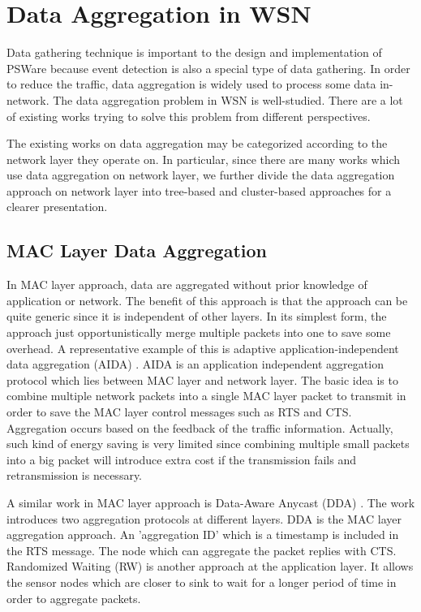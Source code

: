 \section{Data Aggregation in WSN}
Data gathering technique is important to the design and implementation of PSWare because event detection is also a special type of data gathering. In order to reduce the traffic, data aggregation is widely used to process some data in-network. The data aggregation problem in WSN is well-studied. There are a lot of existing works trying to solve this problem from different perspectives.

The existing works on data aggregation may be categorized according to the network layer they operate on. In particular, since there are many works which use data aggregation on network layer, we further divide the data aggregation approach on network layer into tree-based and cluster-based approaches for a clearer presentation.

\subsection{MAC Layer Data Aggregation}
In MAC layer approach, data are aggregated without prior knowledge of application or network. The benefit of this approach is that the approach can be quite generic since it is independent of other layers. In its simplest form, the approach just opportunistically merge multiple packets into one to save some overhead. A representative example of this is adaptive application-independent data aggregation (AIDA) \cite{aida}. AIDA is an application independent aggregation protocol which lies between MAC layer and network layer. The basic idea is to combine multiple network packets into a single MAC layer packet to transmit in order to save the MAC layer control messages such as RTS and CTS. Aggregation occurs based on the feedback of the traffic information. Actually, such kind of energy saving is very limited since combining multiple small packets into a big packet will introduce extra cost if the transmission fails and retransmission is necessary.

A similar work in MAC layer approach is Data-Aware Anycast (DDA) \cite{daa}. The work introduces two aggregation protocols at different layers. DDA is the MAC layer aggregation approach. An 'aggregation ID' which is a timestamp is included in the RTS message. The node which can aggregate the packet replies with CTS. Randomized Waiting (RW) is another approach at the application layer. It allows the sensor nodes which are closer to sink to wait for a longer period of time in order to aggregate packets.

